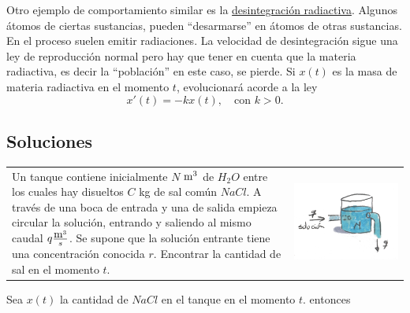 \documentclass{article}
\begin{document}
  Otro ejemplo de comportamiento similar es la \href{http://es.wikipedia.org/wiki/Radiactividad}{desintegración radiactiva}. Algunos átomos de
ciertas sustancias, pueden ``desarmarse'' en átomos de otras sustancias. En el proceso suelen emitir radiaciones.  La velocidad de desintegración sigue una ley
de reproducción normal pero hay que tener en cuenta que la materia radiactiva, es decir la ``población''  en este caso, se pierde. Si $x(t)$ es la masa de materia radiactiva en el momento $t$, evolucionará
acorde a la ley
\[\boxed{x'(t)=-kx(t),\quad\text{con } k>0.}\]



\subsection{Soluciones}

\begin{problema}
\begin{tabular}{m{5cm} m{4.5cm}}
 Un tanque contiene inicialmente $N$ $\hbox{m}^3$ de $H_2O$ entre los cuales hay disueltos $C$ kg de sal común
 $NaCl$. A través de una boca de entrada y una de salida empieza circular la solución, entrando y saliendo al mismo caudal $q\frac{\hbox{m}^3}{s}$. Se supone que 
 la solución entrante tiene una concentración conocida $r$. Encontrar la cantidad de sal en el momento $t$. &
  \includegraphics[scale=.1]{imagenes/tanque.jpg} \\
\end{tabular}
\end{problema}


 Sea $x(t)$ la cantidad de $NaCl$ en el tanque en el momento $t$. entonces
\end{document}
